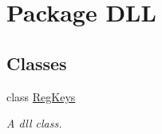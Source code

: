 \hypertarget{namespace_d_l_l}{\section{Package D\+L\+L}
\label{namespace_d_l_l}
}
\subsection*{Classes}
\begin{DoxyCompactItemize}
\item 
class \hyperlink{class_d_l_l_1_1_reg_keys}{Reg\+Keys}
\begin{DoxyCompactList}\small\item\em A dll class. \end{DoxyCompactList}\end{DoxyCompactItemize}
